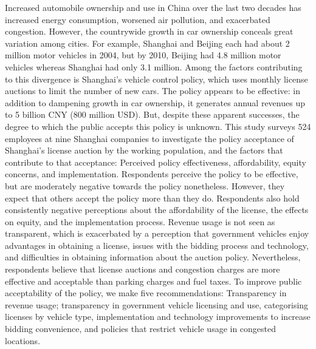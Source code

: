 Increased automobile ownership and use in China over the last two decades has increased energy consumption, worsened air pollution, and exacerbated congestion. However, the countrywide growth in car ownership conceals great variation among cities. For example, Shanghai and Beijing each had about 2 million motor vehicles in 2004, but by 2010, Beijing had 4.8 million motor vehicles whereas Shanghai had only 3.1 million. Among the factors contributing to this divergence is Shanghai’s vehicle control policy, which uses monthly license auctions to limit the number of new cars. The policy appears to be effective: in addition to dampening growth in car ownership, it generates annual revenues up to 5 billion CNY (800 million USD). But, despite these apparent successes, the degree to which the public accepts this policy is unknown. This study surveys 524 employees at nine Shanghai companies to investigate the policy acceptance of Shanghai’s license auction by the working population, and the factors that contribute to that acceptance: Perceived policy effectiveness, affordability, equity concerns, and implementation. Respondents perceive the policy to be effective, but are moderately negative towards the policy nonetheless. However, they expect that others accept the policy more than they do. Respondents also hold consistently negative perceptions about the affordability of the license, the effects on equity, and the implementation process. Revenue usage is not seen as transparent, which is exacerbated by a perception that government vehicles enjoy advantages in obtaining a license, issues with the bidding process and technology, and difficulties in obtaining information about the auction policy. Nevertheless, respondents believe that license auctions and congestion charges are more effective and acceptable than parking charges and fuel taxes. To improve public acceptability of the policy, we make five recommendations: Transparency in revenue usage; transparency in government vehicle licensing and use, categorising licenses by vehicle type, implementation and technology improvements to increase bidding convenience, and policies that restrict vehicle usage in congested locations.
